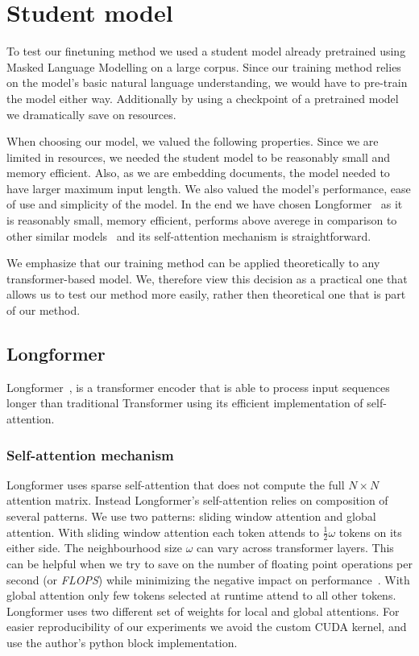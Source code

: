 \section{Student model}\label{section:student_model}


To test our finetuning method we used a student model already pretrained using
Masked Language Modelling on a large corpus. Since our training method relies on
the model's basic natural language understanding, we would have to pre-train the
model either way. Additionally by using a checkpoint of a pretrained model we
dramatically save on resources.

When choosing our model, we valued the following properties. Since we are
limited in resources, we needed the student model to be reasonably small and
memory efficient. Also, as we are embedding documents, the model needed to have
larger maximum input length. We also valued the model's performance, ease of use
and simplicity of the model. In the end we have chosen
Longformer~\citep{beltagy2020longformer} as it is reasonably small, memory
efficient, performs above averege in comparison to other similar
models~\citep{tay2020long} and its self-attention mechanism is straightforward.

We emphasize that our training method can be applied theoretically to any
transformer-based model. We, therefore view this decision as a practical one
that allows us to test our method more easily, rather then theoretical one that
is part of our method.

\subsection{Longformer}

Longformer~\citep{beltagy2020longformer}, is a transformer encoder that is able
to process input sequences longer than traditional Transformer using its
efficient implementation of self-attention.

\subsubsection{Self-attention mechanism}

Longformer uses sparse self-attention that does not compute the full $N \times
N$ attention matrix. Instead Longformer's self-attention relies on composition
of several patterns. We use two patterns: sliding window attention and global
attention. With sliding window attention each token attends to
$\frac{1}{2}\omega$ tokens on its either side. The neighbourhood size $\omega$
can vary across transformer layers. This can be helpful when we try to save on
the number of floating point operations per second (or \emph{FLOPS}) while
minimizing the negative impact on performance~\citep{sukhbaatar2019adaptive}.
With global attention only few tokens selected at runtime attend to all other
tokens. Longformer uses two different set of weights for local and global
attentions. For easier reproducibility of our experiments we avoid the custom
CUDA kernel, and use the author's python block implementation.

